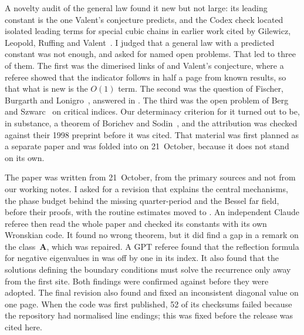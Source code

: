 A novelty audit of the general law found it new but not large: its leading constant is the
one Valent's conjecture predicts, and the Codex check located isolated leading terms for
special cubic chains in earlier work cited by Gilewicz, Leopold, Ruffing and
Valent~\cite{GLRV2006}. I judged that a general law with a predicted constant was not
enough, and asked for named open problems. That led to three of them. The first was the
dimerised links of  and Valent's conjecture, where a referee showed that the
indicator follows in half a page from known results, so that what is new is the $O(1)$
term. The second was the question of Fischer, Burgarth and Lonigro~\cite{FBL2026}, answered
in . The third was the open problem of Berg and Szwarc~\cite{BergSzwarc2026}
on critical indices. Our determinacy criterion for it turned out to be, in substance, a
theorem of Borichev and Sodin~\cite{BorichevSodin1998}, and the attribution was checked
against their 1998 preprint before it was cited. That material was first planned as a
separate paper and was folded into  on 21~October, because it does not
stand on its own.

The paper was written from 21~October, from the primary sources and not from our working
notes. I asked for a revision that explains the central mechanisms, the phase budget behind
the missing quarter-period and the Bessel far field, before their proofs, with the routine
estimates moved to . An independent Claude referee then read the whole
paper and checked its constants with its own Wronskian code. It found no wrong theorem, but
it did find a gap in a remark on the class~$\mathbf A$, which was repaired. A GPT referee
found that the reflection formula for negative eigenvalues in  was off by
one in its index. It also found that the solutions defining the boundary conditions must
solve the recurrence only away from the first site. Both findings were confirmed against
 before they were adopted. The final revision also found and fixed an
inconsistent diagonal value on one page. When the code was first published, 52 of its
checksums failed because the repository had normalised line endings; this was fixed before
the release was cited here.
